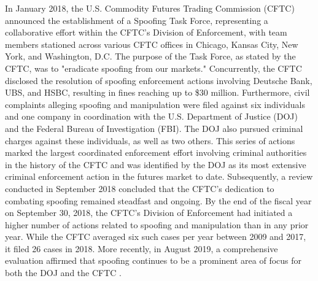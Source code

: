 In January 2018, the U.S. Commodity Futures Trading Commission (CFTC) announced the establishment of a Spoofing Task Force,
representing a collaborative effort within the CFTC's Division of Enforcement, with team members stationed across various
CFTC offices in Chicago, Kansas City, New York, and Washington, D.C. The purpose of the Task Force, as stated by the CFTC,
was to "eradicate spoofing from our markets." Concurrently, the CFTC disclosed the resolution of spoofing enforcement actions
involving Deutsche Bank, UBS, and HSBC, resulting in fines reaching up to \$30 million. Furthermore, civil complaints alleging
spoofing and manipulation were filed against six individuals and one company in coordination with the U.S. Department of
Justice (DOJ) and the Federal Bureau of Investigation (FBI). The DOJ also pursued criminal charges against these individuals,
as well as two others. This series of actions marked the largest coordinated enforcement effort involving criminal authorities
in the history of the CFTC and was identified by the DOJ as its most extensive criminal enforcement action in the futures
market to date. Subsequently, a review conducted in September 2018 concluded that the CFTC's dedication to combating spoofing
remained steadfast and ongoing. By the end of the fiscal year on September 30, 2018, the CFTC's Division of Enforcement
had initiated a higher number of actions related to spoofing and manipulation than in any prior year. While the CFTC averaged
six such cases per year between 2009 and 2017, it filed 26 cases in 2018. More recently, in August 2019, a comprehensive
evaluation affirmed that spoofing continues to be a prominent area of focus for both the DOJ and the CFTC \cite{andrews2018cftc,
doherty2019taming}.
